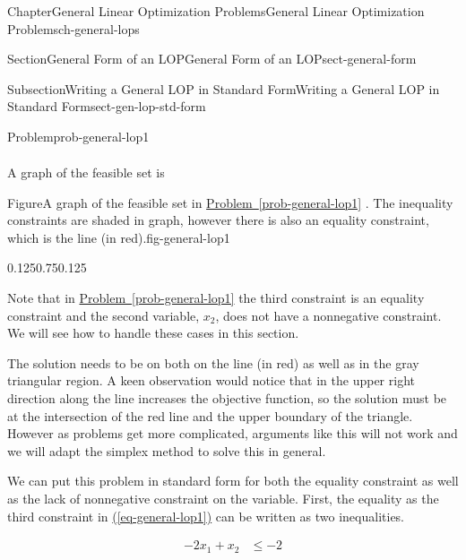 \documentclass[oneside,10pt,]{book}
\newcommand{\xreffont}{\relax}
\numberwithin{equation}{section}
\newcommand{\amp}{&}
\begin{document}
\begin{chapterptx}{Chapter}{General Linear Optimization Problems}{}{General Linear Optimization Problems}{}{}{ch-general-lops}
\begin{sectionptx}{Section}{General Form of an LOP}{}{General Form of an LOP}{}{}{sect-general-form}
\begin{subsectionptx}{Subsection}{Writing a General LOP in Standard Form}{}{Writing a General LOP in Standard Form}{}{}{sect-gen-lop-std-form}
\begin{problem}{Problem}{}{prob-general-lop1}
\begin{equation}
\begin{aligned}
\end{aligned}\label{eq-general-lop1}
\end{equation}
%
\end{problem}
A graph of the feasible set is%
\begin{figureptx}{Figure}{A graph of the feasible set in \hyperref[prob-general-lop1]{Problem~{\xreffont\ref{prob-general-lop1}}} . The inequality constraints are shaded in graph, however there is also an equality constraint, which is the line (in red).}{fig-general-lop1}{}%
\begin{image}{0.125}{0.75}{0.125}{}%
%
\end{image}%
\tcblower
\end{figureptx}%
Note that in \hyperref[prob-general-lop1]{Problem~{\xreffont\ref{prob-general-lop1}}} the third constraint is an equality constraint and the second variable, \(x_2\), does not have a nonnegative constraint. We will see how to handle these cases in this section.%
\par
The solution needs to be on both on the line (in red) as well as in the gray triangular region. A keen observation would notice that in the upper right direction along the line increases the objective function, so the solution must be at the intersection of the red line and the upper boundary of the triangle. However as problems get more complicated, arguments like this will not work and we will adapt the simplex method to solve this in general.%
\par
We can put this problem in standard form for both the equality constraint as well as the lack of nonnegative constraint on the variable. First, the equality as the third constraint in \hyperref[eq-general-lop1]{({\xreffont\ref{eq-general-lop1}})} can be written as two inequalities.%
\par
%
\begin{align*}
-2 x_1 + x_2 \amp \leq -2 \\

\end{align*}
\end{subsectionptx}
\end{sectionptx}
\end{chapterptx}
\end{document}
